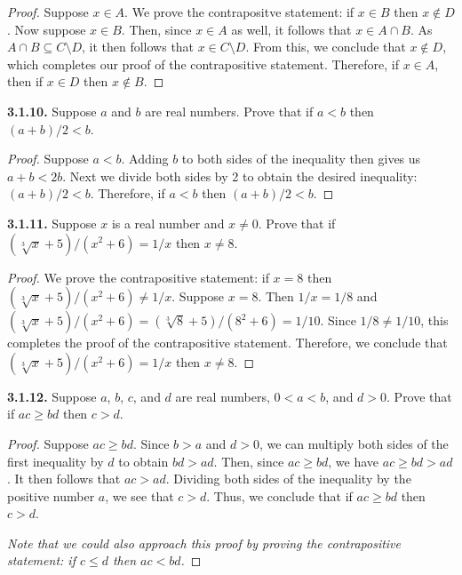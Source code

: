 \documentclass[12pt]{amsart}
\newenvironment{statement}[1]{\smallskip\noindent\color[rgb]{.6627, .3529, .6314} {\bf #1.}}{}
\theoremstyle{definition}
\theoremstyle{remark}
\begin{document}
\begin{proof}
Suppose $x \in A$.
We prove the contrapositve statement: if $x \in B$ then $x \notin D$.
Now suppose $x \in B$.
Then, since $x \in A$ as well, it follows that $x \in A \cap B$.
As $A \cap B \subseteq C \setminus D$, it then follows that $x \in C \setminus D$.
From this, we conclude that $x \notin D$, which completes our proof of the contrapositive statement.
Therefore, if $x \in A$, then if $x \in D$ then $x \notin B$.
\end{proof}


\begin{statement}{3.1.10}
Suppose $a$ and $b$ are real numbers.
Prove that if $a < b$ then $(a + b) / 2 < b$.
\end{statement}

\begin{proof}
Suppose $a < b$.
Adding $b$ to both sides of the inequality then gives us $a + b < 2b$.
Next we divide both sides by 2 to obtain the desired inequality: $(a + b)/2 < b$.
Therefore, if $a < b$ then $(a + b)/2 < b$.
\end{proof}


\begin{statement}{3.1.11}
Suppose $x$ is a real number and $x \neq 0$.
Prove that if $(\sqrt[3]{x} + 5) / (x^2 + 6) = 1/x$ then $x \neq 8$.
\end{statement}

\begin{proof}
We prove the contrapositive statement:
if $x = 8$ then $(\sqrt[3]{x} + 5) / (x^2 + 6) \neq 1/x$.
Suppose $x = 8$.
Then $1/x = 1/8$ and
$(\sqrt[3]{x} + 5) / (x^2 + 6) = (\sqrt[3]{8} + 5) / (8^2 + 6) = 1/10$.
Since $1/8 \neq 1/10$, this completes the proof of the contrapositive statement.
Therefore, we conclude that $(\sqrt[3]{x} + 5) / (x^2 + 6) = 1/x$ then $x \neq 8$.
\end{proof}


\begin{statement}{3.1.12}
Suppose $a$, $b$, $c$, and $d$ are real numbers, $0 < a < b$, and $d > 0$.
Prove that if $ac \geq bd$ then $c > d$.
\end{statement}

\begin{proof}
Suppose $ac \geq bd$.
Since $b > a$ and $d > 0$, we can multiply both sides of the first inequality by $d$ to obtain $bd > ad$.
Then, since $ac \geq bd$, we have $ac \geq bd > ad$.
It then follows that $ac > ad$.
Dividing both sides of the inequality by the positive number $a$, we see that $c > d$.
Thus, we conclude that if $ac \geq bd$ then $c > d$.

\emph{Note that we could also approach this proof by proving the contrapositive statement: if $c \leq d$ then $ac < bd$.}
\end{proof}
\end{document}
